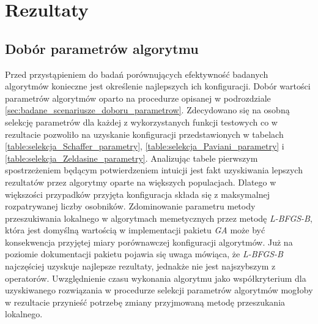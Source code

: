 \chapter{Rezultaty}
\section{Dobór parametrów algorytmu}
Przed przystąpieniem do badań porównujących efektywność badanych algorytmów konieczne jest określenie najlepszych ich konfiguracji. Dobór wartości parametrów algorytmów oparto na procedurze opisanej w podrozdziale \ref{sec:badane_scenariusze_doboru_parametrow}. Zdecydowano się na osobną selekcję parametrów dla każdej z wykorzystanych funkcji testowych co w rezultacie pozwoliło na uzyskanie konfiguracji przedstawionych w tabelach \ref{table:selekcja_Schaffer_parametry}, \ref{table:selekcja_Paviani_parametry} i \ref{table:selekcja_Zeldasine_parametry}. Analizując tabele pierwszym spostrzeżeniem będącym potwierdzeniem intuicji jest fakt uzyskiwania lepszych rezultatów przez algorytmy oparte na większych populacjach. Dlatego w większości przypadków przyjęta konfiguracja składa się z maksymalnej rozpatrywanej liczby osobników. Zdominowanie parametru metody przeszukiwania lokalnego w algorytmach memetycznych przez metodę \emph{L-BFGS-B}, która jest domyślną wartością w implementacji pakietu \emph{GA} może być konsekwencja przyjętej miary porównawczej konfiguracji algorytmów. Już na poziomie dokumentacji pakietu pojawia się uwaga mówiąca, że \emph{L-BFGS-B} najczęściej uzyskuje najlepsze rezultaty, jednakże nie jest najszybszym z operatorów. Uwzględnienie czasu wykonania algorytmu jako współkryterium dla uzyskiwanego rozwiązania w procedurze selekcji parametrów algorytmów mogłoby w rezultacie przynieść potrzebę zmiany przyjmowaną metodę przeszukania lokalnego.

